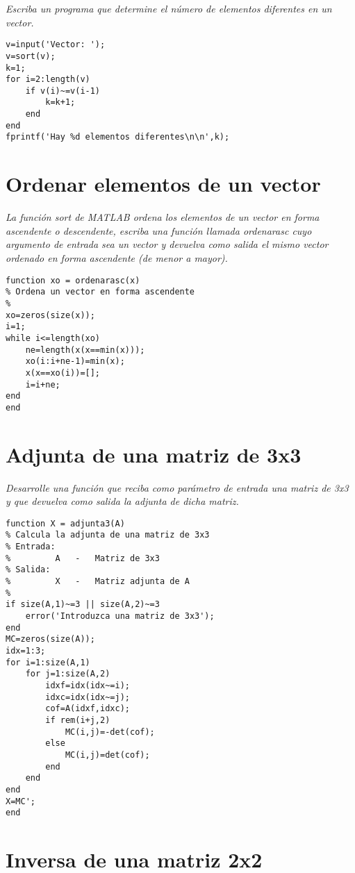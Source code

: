 \textit{Escriba un programa que determine el número de elementos diferentes en un vector.}



\begin{verbatim}
v=input('Vector: ');
v=sort(v);
k=1;
for i=2:length(v)
    if v(i)~=v(i-1)
        k=k+1;
    end
end
fprintf('Hay %d elementos diferentes\n\n',k);
\end{verbatim}

\section{Ordenar elementos de un vector}

\textit{La función sort de MATLAB ordena los elementos de un vector en forma ascendente o descendente, escriba una función llamada ordenarasc cuyo argumento de entrada sea un vector y devuelva como salida el mismo vector ordenado en forma ascendente (de menor a mayor).}



\begin{verbatim}
function xo = ordenarasc(x)
% Ordena un vector en forma ascendente
%
xo=zeros(size(x));
i=1;
while i<=length(xo)
    ne=length(x(x==min(x)));
    xo(i:i+ne-1)=min(x);
    x(x==xo(i))=[];
    i=i+ne;
end
end
\end{verbatim}

\section{Adjunta de una matriz de 3x3}

\textit{Desarrolle una función que reciba como parámetro de entrada una matriz de 3x3 y que devuelva como salida la adjunta de dicha matriz.}



\begin{verbatim}
function X = adjunta3(A)
% Calcula la adjunta de una matriz de 3x3
% Entrada:
%         A   -   Matriz de 3x3
% Salida:
%         X   -   Matriz adjunta de A
%
if size(A,1)~=3 || size(A,2)~=3
    error('Introduzca una matriz de 3x3');
end
MC=zeros(size(A));
idx=1:3;
for i=1:size(A,1)
    for j=1:size(A,2)
        idxf=idx(idx~=i);
        idxc=idx(idx~=j);
        cof=A(idxf,idxc);
        if rem(i+j,2)
            MC(i,j)=-det(cof);
        else
            MC(i,j)=det(cof);
        end
    end
end
X=MC';
end
\end{verbatim}


\section{Inversa de una matriz 2x2}

